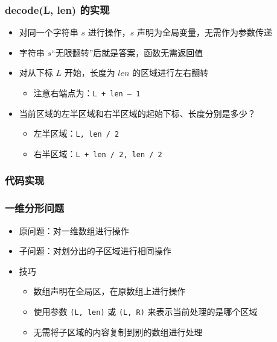 \begin{frame}[fragile]
    \frametitle{decode(L, len) 的实现}
    \begin{itemize}[<+->]
        \item 对同一个字符串 $s$ 进行操作，$s$ 声明为全局变量，无需作为参数传递
        \item 字符串 $s$“无限翻转”后就是答案，函数无需返回值
        \item 对从下标 $L$ 开始，长度为 $len$ 的区域进行左右翻转
        \begin{itemize}
            \item 注意右端点为：\lstinline|L + len – 1|
        \end{itemize}
        \item 当前区域的左半区域和右半区域的起始下标、长度分别是多少？
        \begin{itemize}
            \item 左半区域：\lstinline|L, len / 2|
            \item 右半区域：\lstinline|L + len / 2, len / 2|
        \end{itemize}
    \end{itemize}
\end{frame}

\begin{frame}[fragile]
    \frametitle{代码实现}
    
\end{frame}

\begin{frame}[fragile]
    \frametitle{一维分形问题}
    \begin{itemize}
        \item 原问题：对一维数组进行操作
        \item 子问题：对划分出的子区域进行相同操作
        \item 技巧
        \begin{itemize}
            \item 数组声明在全局区，在原数组上进行操作
            \item 使用参数 \lstinline|(L, len)| 或 \lstinline|(L, R)| 来表示当前处理的是哪个区域
            \item 无需将子区域的内容复制到别的数组进行处理
        \end{itemize}
    \end{itemize}

\end{frame}

